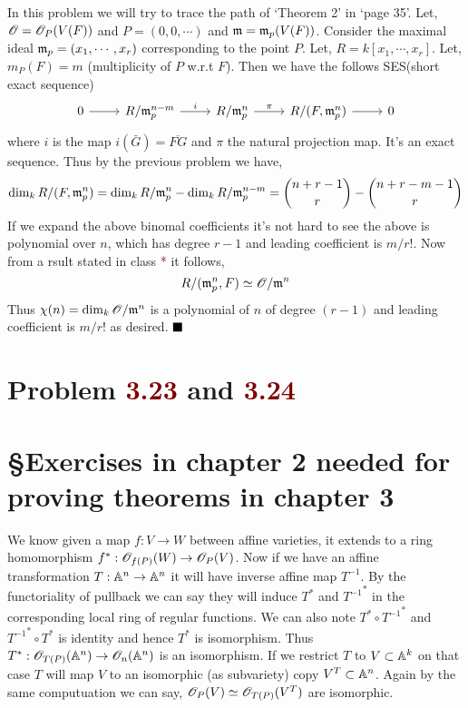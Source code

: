 \documentclass[12pt]{article}
\begin{document}
In this problem we will try to trace the path of `Theorem 2' in `page 35'. Let, $\mathscr{O} = \mathscr{O}_P(V(F))$ and $P=(0,0,\cdots)$ and $\mathfrak{m} = \mathfrak{m}_p(V(F))$. Consider the maximal ideal $\mathfrak{m}_p=(x_1,\cdots,x_r)$ corresponding to the point $P$. Let, $R = k[x_1,\cdots,x_r]$. Let, $m_P(F)=m$ (multiplicity of $P$ w.r.t $F$). Then we have the follows SES(short exact sequence) \[\begin{tikzcd}
    0 & {R/\m_p^{n-m}} & {R/\m_p^n} & {R/(F,\m_p^n)} & 0
    \arrow[from=1-1, to=1-2]
    \arrow["i", from=1-2, to=1-3]
    \arrow["\pi", from=1-3, to=1-4]
    \arrow[from=1-4, to=1-5]
    \end{tikzcd}\]
where $i$ is the map $i(\bar{G})=\overline{FG}$ and $\pi$ the natural projection map. It's an exact sequence. Thus by the previous problem we have, $$\dim_k R/(F,\mathfrak{m}_p^n) = \dim_k R/\mathfrak{m}_p^n - \dim_k R/\mathfrak{m}_p^{n-m}= \binom{n+r-1}{r}-\binom{n+r-m-1}{r}$$ If we expand the above binomal coefficients it's not hard to see the above is polynomial over $n$, which has degree $r-1$ and leading coefficient is $m/r!$. Now from a rsult stated in class \textcolor{maroon}{*} it follows, $$R/(\mathfrak{m}_p^n,F) \simeq \mathscr{O}/\mathfrak{m}^n$$ Thus $\chi(n) = \dim_k \mathscr{O}/\mathfrak{m}^n$ is a polynomial of $n$ of degree $(r-1)$ and leading coefficient is $m/r!$ as desired. $\hfill \blacksquare$


\section{Problem \textcolor{maroon}{3.23} and \textcolor{maroon}{3.24}} %


\pagebreak

\section*{\S Exercises in chapter 2 needed for proving theorems in chapter 3}

\textcolor{maroon}{} We know given a map $f : V \to W$ between affine varieties, it extends to a ring homomorphism $f^{\ast}: \mathscr{O}_{f(P)}(W) \to \mathscr{O}_{P}(V)$. Now if we have an affine transformation $T : \mathbb{A}^n \to \mathbb{A}^n$ it will have inverse affine map $T^{-1}$. By the functoriality of pullback we can say they will induce $T^{\ast}$ and ${T^{-1}}^{\ast}$ in the corresponding local ring of regular functions. We can also note $T^{\ast} \circ {T^{-1}}^{\ast}$ and ${T^{-1}}^{\ast} \circ T^{\ast}$ is identity and hence $T^{\ast}$ is isomorphism. Thus $T^{\ast}: \mathscr{O}_{T(P)}(\mathbb{A}^n) \to \mathscr{O}_n(\mathbb{A}^n)$ is an isomorphism. If we restrict $T$ to $V \subset \mathbb{A}^k$ on that case $T$ will map $V$ to an isomorphic (as subvariety) copy $V^T\subset \mathbb{A}^n$. Again by the same computuation we can say, $\mathscr{O}_{P}(V) \simeq \mathscr{O}_{T(P)}(V^T)$ are isomorphic.
\end{document}
